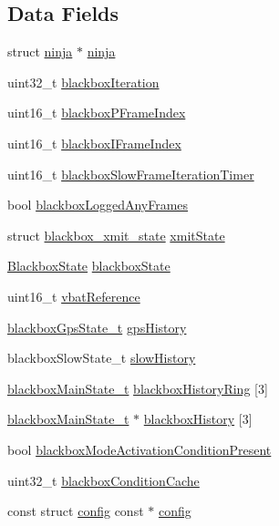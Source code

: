 \subsection*{Data Fields}
\begin{DoxyCompactItemize}
\item 
struct \hyperlink{structninja}{ninja} $\ast$ \hyperlink{structblackbox_ad1ca28ccce2a76596368f3ce76abc3cf}{ninja}
\item 
uint32\+\_\+t \hyperlink{structblackbox_a4be2bd38a081619ebd4e036c4262f36f}{blackbox\+Iteration}
\item 
uint16\+\_\+t \hyperlink{structblackbox_acfbd06235587240bb59fdef21ae23e79}{blackbox\+P\+Frame\+Index}
\item 
uint16\+\_\+t \hyperlink{structblackbox_a53fda8258a3afa2aa4dbd6e40b9c5310}{blackbox\+I\+Frame\+Index}
\item 
uint16\+\_\+t \hyperlink{structblackbox_ae75eac303420982b1f190be3ebd8da0c}{blackbox\+Slow\+Frame\+Iteration\+Timer}
\item 
bool \hyperlink{structblackbox_aafc18cfced67e6e90200fed625aa4ad6}{blackbox\+Logged\+Any\+Frames}
\item 
struct \hyperlink{structblackbox__xmit__state}{blackbox\+\_\+xmit\+\_\+state} \hyperlink{structblackbox_ad774334afdeef330f56edbbb69755c0b}{xmit\+State}
\item 
\hyperlink{blackbox_2blackbox_8h_a09b86b72976318ac31cbd8a3f2bc0ff2}{Blackbox\+State} \hyperlink{structblackbox_ad8637b678f883ef1fe458b3be7088836}{blackbox\+State}
\item 
uint16\+\_\+t \hyperlink{structblackbox_a902deabb52e9aa85f6002b40c99fd503}{vbat\+Reference}
\item 
\hyperlink{blackbox_2blackbox_8h_a52c59fa600a792b6b63268ea2da5d4d1}{blackbox\+Gps\+State\+\_\+t} \hyperlink{structblackbox_a8a9a1274f52bbbb99aa7df75cc4dc174}{gps\+History}
\item 
blackbox\+Slow\+State\+\_\+t \hyperlink{structblackbox_a187e0091150ef4dddc850cd94c899b33}{slow\+History}
\item 
\hyperlink{blackbox_2blackbox_8h_a23d23d407770f0d2761aea77f135dfbb}{blackbox\+Main\+State\+\_\+t} \hyperlink{structblackbox_a12cbdd7255f02c937a8bea11abf85136}{blackbox\+History\+Ring} \mbox{[}3\mbox{]}
\item 
\hyperlink{blackbox_2blackbox_8h_a23d23d407770f0d2761aea77f135dfbb}{blackbox\+Main\+State\+\_\+t} $\ast$ \hyperlink{structblackbox_a491fa7cf7873244917f1821f209e86cf}{blackbox\+History} \mbox{[}3\mbox{]}
\item 
bool \hyperlink{structblackbox_a26c71f13b3b0d634a28da8226d3ecfa7}{blackbox\+Mode\+Activation\+Condition\+Present}
\item 
uint32\+\_\+t \hyperlink{structblackbox_a536742947b0989318bbada351c217b5b}{blackbox\+Condition\+Cache}
\item 
const struct \hyperlink{structconfig}{config} const $\ast$ \hyperlink{structblackbox_ae4db1da551d96d8041d5d57300b08ef9}{config}
\end{DoxyCompactItemize}


